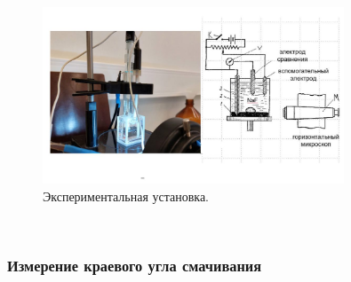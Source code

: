 \documentclass[a4paper,12pt]{article}
\begin{document}
\begin{figure}[h!]
    \centering
    \includegraphics[width = 0.8\textwidth]{2022-12-29 02.14.12.jpg}
    \caption{Экспериментальная установка.}
    \label{fig:no_int}
\end{figure}\\

\subsubsection{Измерение краевого угла смачивания}
\end{document}
